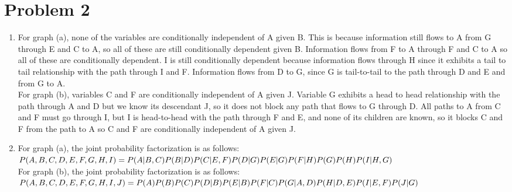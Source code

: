 \documentclass[12pt,letterpaper]{article}
\begin{document}
\section*{Problem 2}
\begin{enumerate}[label={(\alph*) }]
        \item
 
For graph (a), none of the variables are conditionally independent of A given B. This is because information still flows to A from G through E and C to A, so all of these are still conditionally dependent given B. Information flows from F to A through F and C to A so all of these are conditionally dependent. I is still conditionally dependent because information flows through H since it exhibits a tail to tail relationship with the path through I and F. Information flows from D to G, since G is tail-to-tail to the path through D and E and from G to A. \\

For graph (b), variables C and F are conditionally independent of A given J. Variable G exhibits a head to head relationship with the path through A and D but we know its descendant J, so it does not block any path that flows to G through D. All paths to A from C and F must go through I, but I is head-to-head with the path through F and E, and none of its children are known, so it blocks C and F from the path to A so C and F are conditionally independent of A given J.  \\  

\item
For graph (a), the joint probability factorization is as follows: \medskip \\
$P(A, B, C, D, E, F, G, H, I) = \\ P(A|B, C)P(B|D)P(C|E,F)P(D|G)P(E|G)P(F|H)P(G)P(H)P(I|H,G)$ \\

For graph (b), the joint probability factorization is as follows:  \medskip \\
$P(A, B, C, D, E, F, G, H, I,J) = \\ P(A)P(B)P(C)P(D|B)P(E|B)P(F|C)P(G|A,D)P(H|D,E)P(I|E,F)P(J|G)$ \\

\newpage



\end{enumerate}
\end{document}
